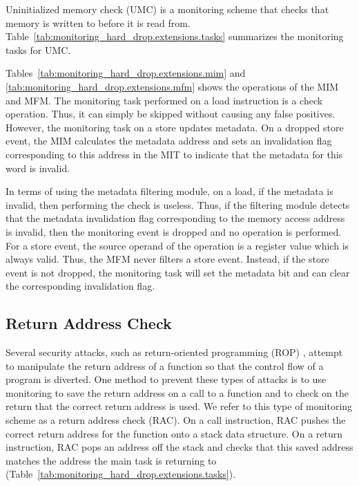 Uninitialized memory check (UMC) is a monitoring scheme that checks that memory
is written to before it is read from.
Table~\ref{tab:monitoring_hard_drop.extensions.tasks} summarizes the monitoring
tasks for UMC.

Tables~\ref{tab:monitoring_hard_drop.extensions.mim} and
\ref{tab:monitoring_hard_drop.extensions.mfm} shows the operations of
the MIM and MFM. The monitoring task performed on a load instruction is a check
operation.  Thus, it can simply be skipped without causing any false positives.
However, the monitoring task on a store updates metadata. On a dropped store
event, the MIM calculates the metadata address and sets an invalidation flag
corresponding to this address in the MIT to indicate that the metadata for this
word is invalid.

In terms of using the metadata filtering module, on a load, if the metadata is
invalid, then performing the check is useless. Thus, if the filtering module
detects that the metadata invalidation flag corresponding to the memory access
address is invalid, then the monitoring event is dropped and no operation is
performed.  For a store event, the source operand of the operation is a
register value which is always valid. Thus, the MFM never filters a store
event. Instead, if the store event is not dropped, the monitoring task will set the
metadata bit and can clear the corresponding invalidation flag.

\subsection{Return Address Check}
\label{sec:monitoring_hard_drop.extensions.lrc}

Several security attacks, such as return-oriented programming (ROP)
\cite{rop-ccs07}, attempt to manipulate the return address of a
function so that the control flow of a program is diverted. One method to
prevent these types of attacks is to use monitoring to save the return address
on a call to a function and to check on the return that the correct return
address is used. We refer to this type of monitoring scheme as a return address
check (RAC). On a call instruction, RAC pushes the correct return address for
the function onto a stack data structure. On a return instruction, RAC pops an
address off the stack and checks that this saved address matches the address the
main task is returning to (Table~\ref{tab:monitoring_hard_drop.extensions.tasks}).

